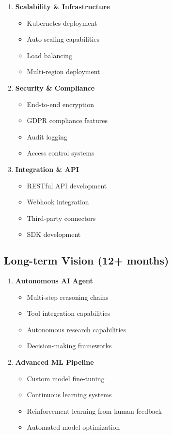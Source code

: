 \documentclass[12pt,a4paper]{article}
\begin{document}
\begin{enumerate}
    \item \textbf{Scalability \& Infrastructure}
    \begin{itemize}
        \item Kubernetes deployment
        \item Auto-scaling capabilities
        \item Load balancing
        \item Multi-region deployment
    \end{itemize}
    
    \item \textbf{Security \& Compliance}
    \begin{itemize}
        \item End-to-end encryption
        \item GDPR compliance features
        \item Audit logging
        \item Access control systems
    \end{itemize}
    
    \item \textbf{Integration \& API}
    \begin{itemize}
        \item RESTful API development
        \item Webhook integration
        \item Third-party connectors
        \item SDK development
    \end{itemize}
\end{enumerate}

\subsection{Long-term Vision (12+ months)}

\begin{enumerate}
    \item \textbf{Autonomous AI Agent}
    \begin{itemize}
        \item Multi-step reasoning chains
        \item Tool integration capabilities
        \item Autonomous research capabilities
        \item Decision-making frameworks
    \end{itemize}
    
    \item \textbf{Advanced ML Pipeline}
    \begin{itemize}
        \item Custom model fine-tuning
        \item Continuous learning systems
        \item Reinforcement learning from human feedback
        \item Automated model optimization
    \end{itemize}
\end{enumerate}
\end{document}
